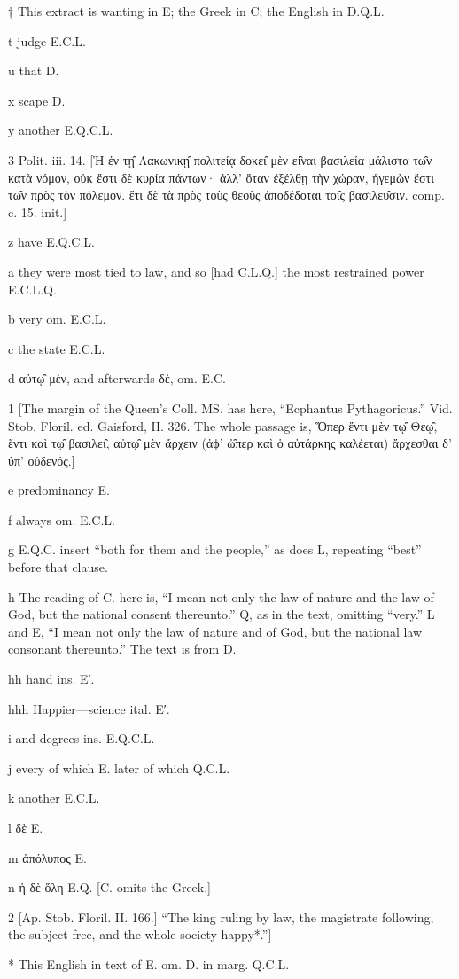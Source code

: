 †
This extract is wanting in E; the Greek in C; the English in D.Q.L.

t
judge E.C.L.

u
that D.

x
scape D.

y
another E.Q.C.L.

3
Polit. iii. 14. [Ἡ ἐν τῃ̑ Λακωνικῃ̑ πολιτείᾳ δοκει̑ μὲν εἰ̑ναι βασιλεία μάλιστα τω̑ν κατὰ νόμον, οὐκ ἔστι δὲ κυρία πάντων· ἀλλ’ ὅταν ἐξέλθῃ τὴν χώραν, ἡγεμὼν ἔστι τω̑ν πρὸς τὸν πόλεμον. ἔτι δὲ τὰ πρὸς τοὺς θεοὺς ἀποδέδοται τοι̑ς βασιλευ̑σιν. comp. c. 15. init.]

z
have E.Q.C.L.

a
they were most tied to law, and so [had C.L.Q.] the most restrained power E.C.L.Q.

b
very om. E.C.L.

c
the state E.C.L.

d
αὐτῳ̑ μὲν, and afterwards δὲ, om. E.C.

1
[The margin of the Queen’s Coll. MS. has here, “Ecphantus Pythagoricus.” Vid. Stob. Floril. ed. Gaisford, II. 326. The whole passage is, Ὅπερ ἔντι μὲν τῳ̑ Θεῳ̑, ἕντι καὶ τῳ̑ βασιλει̑, αὐτῳ̑ μὲν ἄρχειν (ἀϕ’ ὠ̑περ καὶ ὁ αὐτάρκης καλέεται) ἄρχεσθαι δ’ ὑπ’ οὐδενός.]

e
predominancy E.

f
always om. E.C.L.

g
E.Q.C. insert “both for them and the people,” as does L, repeating “best” before that clause.

h
The reading of C. here is, “I mean not only the law of nature and the law of God, but the national consent thereunto.” Q, as in the text, omitting “very.” L and E, “I mean not only the law of nature and of God, but the national law consonant thereunto.” The text is from D.

hh
hand ins. E′.

hhh
Happier—science ital. E′.

i
and degrees ins. E.Q.C.L.

j
every of which E. later of which Q.C.L.

k
another E.C.L.

l
δὲ E.

m
ἀπόλυπος E.

n
ἡ δὲ ὅλη E.Q. [C. omits the Greek.]

2
[Ap. Stob. Floril. II. 166.] “The king ruling by law, the magistrate following, the subject free, and the whole society happy*.”]

*
This English in text of E. om. D. in marg. Q.C.L.

